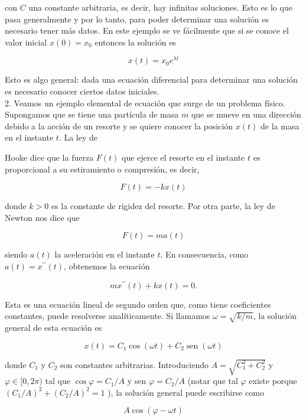 \documentclass[10pt]{article}
\begin{document}
con $C$ una constante arbitraria, es decir, hay infinitas soluciones. Esto es lo que pasa generalmente y por lo tanto, para poder determinar una solución es necesario tener más datos. En este ejemplo se ve fácilmente que si se conoce el valor inicial $x(0)=x_{0}$ entonces la solución es

$$
x(t)=x_{0} e^{\lambda t}
$$

Esto es algo general: dada una ecuación diferencial para determinar una solución es necesario conocer ciertos datos iniciales.\\
2. Veamos un ejemplo elemental de ecuación que surge de un problema físico. Supongamos que se tiene una partícula de masa $m$ que se mueve en una dirección debido a la acción de un resorte y se quiere conocer la posición $x(t)$ de la masa en el instante $t$. La ley de

Hooke dice que la fuerza $F(t)$ que ejerce el resorte en el instante $t$ es proporcional a su estiramiento o compresión, es decir,

$$
F(t)=-k x(t)
$$

donde $k>0$ es la constante de rigidez del resorte. Por otra parte, la ley de Newton nos dice que

$$
F(t)=m a(t)
$$

siendo $a(t)$ la aceleración en el instante $t$. En consecuencia, como $a(t)=x^{\prime \prime}(t)$, obtenemos la ecuación

$$
m x^{\prime \prime}(t)+k x(t)=0 .
$$

Esta es una ecuación lineal de segundo orden que, como tiene coeficientes constantes, puede resolverse analíticamente. Si llamamos $\omega=\sqrt{k / m}$, la solución general de esta ecuación es

$$
x(t)=C_{1} \cos (\omega t)+C_{2} \operatorname{sen}(\omega t)
$$

donde $C_{1}$ y $C_{2}$ son constantes arbitrarias. Introduciendo $A=\sqrt{C_{1}^{2}+C_{2}^{2}}$ y $\varphi \in[0,2 \pi)$ tal que $\cos \varphi=C_{1} / A$ y sen $\varphi=C_{2} / A$ (notar que tal $\varphi$ existe porque $\left(C_{1} / A\right)^{2}+\left(C_{2} / A\right)^{2}=1$ ), la solución general puede escribirse como

$$
A \cos (\varphi-\omega t)
$$
\end{document}
